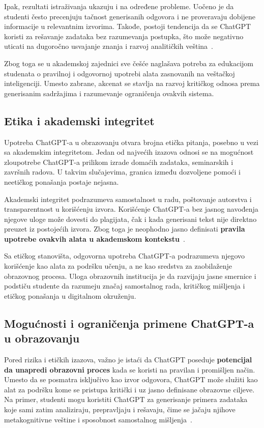 \documentclass[a4paper, 12pt]{article}
\begin{document}
Ipak, rezultati istraživanja ukazuju i na određene probleme. Uočeno je da studenti često precenjuju tačnost generisanih odgovora i ne proveravaju dobijene informacije u relevantnim izvorima. Takođe, postoji tendencija da se ChatGPT koristi za rešavanje zadataka bez razumevanja postupka, što može negativno uticati na dugoročno usvajanje znanja i razvoj analitičkih veština~\cite{bender2021}.

Zbog toga se u akademskoj zajednici sve češće naglašava potreba za edukacijom studenata o pravilnoj i odgovornoj upotrebi alata zasnovanih na veštačkoj inteligenciji. Umesto zabrane, akcenat se stavlja na razvoj kritičkog odnosa prema generisanim sadržajima i razumevanje ograničenja ovakvih sistema.

\subsection{Etika i akademski integritet}

Upotreba ChatGPT-a u obrazovanju otvara brojna etička pitanja, posebno u vezi sa akademskim integritetom. Jedan od najvećih izazova odnosi se na mogućnost zloupotrebe ChatGPT-a prilikom izrade domaćih zadataka, seminarskih i završnih radova. U takvim slučajevima, granica između dozvoljene pomoći i neetičkog ponašanja postaje nejasna.

Akademski integritet podrazumeva samostalnost u radu, poštovanje autorstva i transparentnost u korišćenju izvora. Korišćenje ChatGPT-a bez jasnog navođenja njegove uloge može dovesti do plagijata, čak i kada generisani tekst nije direktno preuzet iz postojećih izvora. Zbog toga je neophodno jasno definisati \textbf{pravila upotrebe ovakvih alata u akademskom kontekstu}~\cite{bender2021}.

Sa etičkog stanovišta, odgovorna upotreba ChatGPT-a podrazumeva njegovo korišćenje kao alata za podršku učenju, a ne kao sredstva za zaobilaženje obrazovnog procesa. Uloga obrazovnih institucija je da razvijaju jasne smernice i podstiču studente da razumeju značaj samostalnog rada, kritičkog mišljenja i etičkog ponašanja u digitalnom okruženju.


\subsection{Mogućnosti i ograničenja primene ChatGPT-a u obrazovanju}

Pored rizika i etičkih izazova, važno je istaći da ChatGPT poseduje \textbf{potencijal da unapredi obrazovni proces} kada se koristi na pravilan i promišljen način. Umesto da se posmatra isključivo kao izvor odgovora, ChatGPT može služiti kao alat za podršku kome se pristupa kritički i uz jasno definisane obrazovne ciljeve. Na primer, studenti mogu koristiti ChatGPT za generisanje primera zadataka koje sami zatim analiziraju, prepravljaju i rešavaju, čime se jačaju njihove metakognitivne veštine i sposobnost samostalnog mišljenja~\cite{openai2023}.
\end{document}
